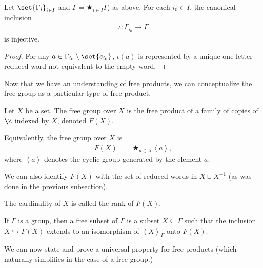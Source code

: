 \documentclass[10pt]{mypackage}
\begin{document}
\begin{corollary}
  Let $\set{\Gamma_i}_{i\in I}$ and $\Gamma = \bigstar_{i\in I}\Gamma_i$ as above. For each $i_0\in I$, the canonical inclusion
  \begin{align*}
    \iota\colon \Gamma_{i_0}\rightarrow \Gamma
  \end{align*}
  is injective.
\end{corollary}
\begin{proof}
  For any $a\in \Gamma_{i_0}\setminus \set{e_{i_0}}$, $\iota\left(a\right)$ is represented by a unique one-letter reduced word not equivalent to the empty word.
\end{proof}
Now that we have an understanding of free products, we can conceptualize the free group as a particular type of free product.
\begin{definition}
  Let $X$ be a set. The free group over $X$ is the free product of a family of copies of $\Z$ indexed by $X$, denoted $F(X)$.\newline

  Equivalently, the free group over $X$ is
  \begin{align*}
    F(X) &= \bigstar_{a\in X}\left\langle a \right\rangle,
  \end{align*}
  where $\left\langle a \right\rangle$ denotes the cyclic group generated by the element $a$.\newline

  We can also identify $F(X)$ with the set of reduced words in $X\sqcup X^{-1}$ (as was done in the previous subsection).\newline

  The cardinality of $X$ is called the rank of $F(X)$.\newline

  If $\Gamma$ is a group, then a free subset of $\Gamma$ is a subset $X\subseteq \Gamma$ such that the inclusion $X\hookrightarrow F(X)$ extends to an isomorphism of $\left\langle X \right\rangle_{\Gamma}$ onto $F(X)$.
\end{definition}
We can now state and prove a universal property for free products (which naturally simplifies in the case of a free group.)
\end{document}
